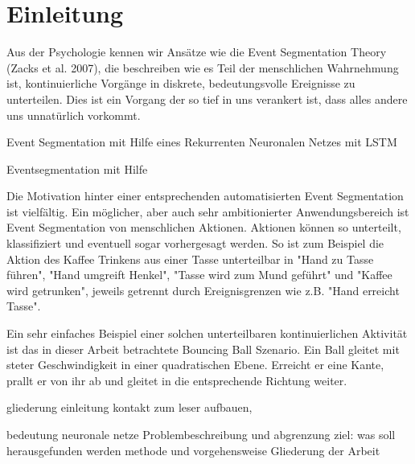 \chapter{Einleitung}
\label{ch:introduction}
Aus der Psychologie kennen wir Ansätze wie die Event Segmentation Theory (Zacks et al. 2007), die beschreiben wie es Teil der menschlichen Wahrnehmung ist, kontinuierliche Vorgänge in diskrete, bedeutungsvolle Ereignisse zu unterteilen\cite{bib:est}. Dies ist ein Vorgang der so tief in uns verankert ist, dass alles andere uns unnatürlich vorkommt. 

Event Segmentation mit Hilfe eines Rekurrenten Neuronalen Netzes mit LSTM

Eventsegmentation mit Hilfe 


	
		Die Motivation hinter einer entsprechenden automatisierten Event Segmentation ist vielfältig. Ein möglicher, aber auch sehr ambitionierter Anwendungsbereich ist Event Segmentation von menschlichen Aktionen. Aktionen können so unterteilt, klassifiziert und eventuell sogar vorhergesagt werden. So ist zum Beispiel die Aktion des Kaffee Trinkens aus einer Tasse unterteilbar in "Hand zu Tasse führen", "Hand umgreift Henkel", "Tasse wird zum Mund geführt" und "Kaffee wird getrunken", jeweils getrennt durch Ereignisgrenzen wie z.B. "Hand erreicht Tasse". 
		
		Ein sehr einfaches Beispiel einer solchen unterteilbaren kontinuierlichen Aktivität ist das in dieser Arbeit betrachtete Bouncing Ball Szenario. Ein Ball gleitet mit steter Geschwindigkeit in einer quadratischen Ebene. Erreicht er eine Kante, prallt er von ihr ab und gleitet in die entsprechende Richtung weiter.
		
		
		
		gliederung einleitung
		kontakt zum leser aufbauen, 
		
		bedeutung neuronale netze
		Problembeschreibung und abgrenzung
		ziel: was soll herausgefunden werden
		methode und vorgehensweise
		Gliederung der Arbeit
		
	
 